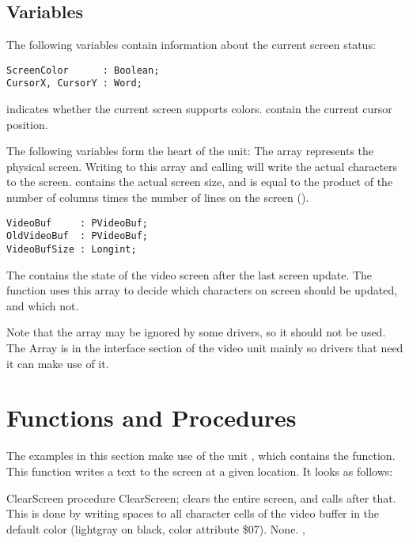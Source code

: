 \subsection{Variables}
The following variables contain information about the current screen
status:
\begin{verbatim}
ScreenColor      : Boolean;
CursorX, CursorY : Word;
\end{verbatim}
 indicates whether the current screen supports colors.
 contain the current cursor position.

The following variables form the heart of the  unit: The
 array represents the physical screen. Writing to this
array and calling  will write the actual characters
to the screen.  contains the actual screen size, and is
equal to the product of the number of columns times the number of lines 
on the screen ().
\begin{verbatim}
VideoBuf     : PVideoBuf;
OldVideoBuf  : PVideoBuf;
VideoBufSize : Longint;
\end{verbatim}
The  contains the state of the video screen after the last
screen update. The  function uses this array to decide
which characters on screen should be updated, and which not. 

Note that the  array may be ignored by some drivers, so
it should not be used. The Array is in the interface section of the video
unit mainly so drivers that need it can make use of it. 

\section{Functions and Procedures}

The examples in this section make use of the unit , which 
contains the  function. This function writes a text to the
screen at a given location. It looks as follows:


\begin{procedure}{ClearScreen}
\Declaration
procedure ClearScreen; 
\Description
{} clears the entire screen, and calls 
after that. This is done by writing spaces to all character cells of the
video buffer in the default color (lightgray on black, color attribute \$07).
\Errors
None.
\SeeAlso
{}, 
\end{procedure}

